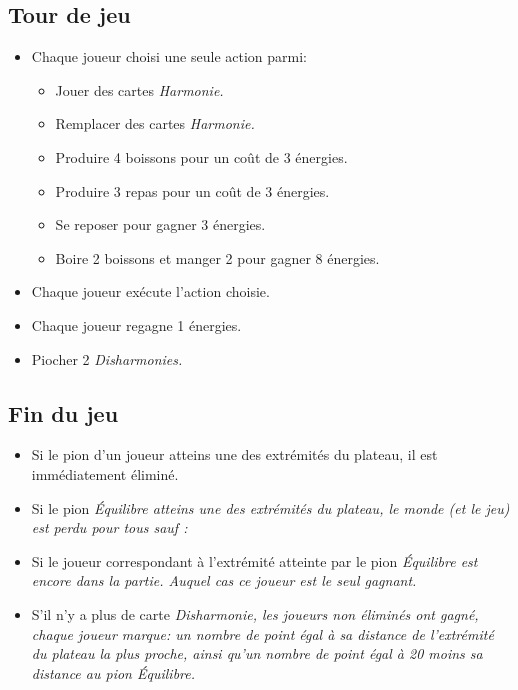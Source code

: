 \documentclass[a4paper]{article}
\newcommand{\disharmonyDraw}{2 }
\newcommand{\restEnergyRate}{3 }
\newcommand{\feedingEnergyRate}{8 }
\newcommand{\feedingBeverageCost}{2 }
\newcommand{\feedingMealCost}{2 }
\newcommand{\passiveEnergyResplenishmentRate}{1 }
\newcommand{\beverageProductionRate}{4 }
\newcommand{\beverageProductionEnergyCost}{3 }
\newcommand{\mealProductionRate}{3 }
\newcommand{\mealProductionEnergyCost}{3 }
\begin{document}
	\subsection{Tour de jeu}
	\begin{itemize}
		\item Chaque joueur choisi une seule action parmi:
		\begin{itemize}
			\item Jouer des cartes \em{Harmonie}.
			\item Remplacer des cartes \em{Harmonie}.
			\item Produire \beverageProductionRate boissons pour un coût de \beverageProductionEnergyCost énergies.
			\item Produire \mealProductionRate repas pour un coût de \mealProductionEnergyCost énergies.
			\item Se reposer pour gagner \restEnergyRate énergies.
			\item Boire \feedingBeverageCost boissons et manger \feedingMealCost pour gagner \feedingEnergyRate énergies.
		\end{itemize}
		\item Chaque joueur exécute l'action choisie.
		\item Chaque joueur regagne \passiveEnergyResplenishmentRate énergies.
		\item Piocher \disharmonyDraw \em{Disharmonies}.
	\end{itemize}
	\subsection{Fin du jeu}
	\begin{itemize}
		\item Si le pion d'un joueur atteins une des extrémités du plateau, il est immédiatement éliminé.
		\item Si le pion \em{Équilibre} atteins une des extrémités du plateau, le monde (et le jeu) est perdu pour tous sauf :
		\item Si le joueur correspondant à l'extrémité atteinte par le pion \em{Équilibre} est encore dans la partie. Auquel cas ce joueur est le seul gagnant. 
		\item S'il n'y a plus de carte \em{Disharmonie}, les joueurs non éliminés ont gagné, chaque joueur marque: un nombre de point égal à sa distance de l'extrémité du plateau la plus proche, ainsi qu'un nombre de point égal à 20 moins sa distance au pion \em{Équilibre}.
	\end{itemize}
\end{document}
